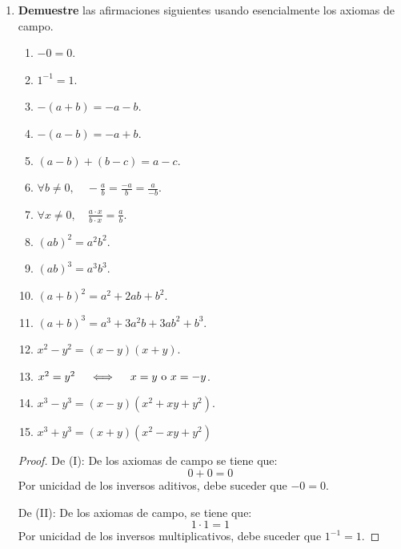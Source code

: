 \documentclass[12pt]{article}
\begin{document}
\begin{enumerate}
    \item \textbf{Demuestre} las afirmaciones siguientes usando esencialmente los axiomas de campo.
    \begin{multicols}{2}
        \begin{enumerate}
            \item $-0=0$.
            \item $1^{-1}=1$.
            \item $-\left(a+b\right)=-a-b$.
            \item $-\left(a-b\right)=-a+b$.
            \item $\left(a-b\right)+\left(b-c\right)=a-c$.
            \item $\forall b\neq 0, \quad -\frac{a}{b}=\frac{-a}{b}=\frac{a}{-b}$.
            \item $\forall x\neq 0, \quad \frac{a\cdot x}{b \cdot x}=\frac{a}{b}$.
            \item $\left(ab\right)^2=a^2b^2$.
            \item $\left(ab\right)^3=a^3b^3$.
            \item $\left(a+b\right)^2=a^2+2ab+b^2$.
            \item $\left(a+b\right)^3=a^3+3a^2b+3ab^2+b^3$.
            \item $x^2-y^2=\left(x-y\right)\left(x+y\right)$.
            \item $x^2=y^2\quad \iff \quad x=y \textup{ o } x=-y$.
            \item $x^3-y^3 = \left(x-y\right)\left(x^2+xy+y^2\right)$.
            \item $x^3+y^3 = \left(x+y\right)\left(x^2-xy+y^2\right)$
        \end{enumerate}
    \end{multicols}
    \begin{proof}
        De (I): De los axiomas de campo se tiene que:
        \begin{equation*}
            0+0=0
        \end{equation*}
        Por unicidad de los inversos aditivos, debe suceder que $-0=0$.
        
        De (II): De los axiomas de campo, se tiene que:
        \begin{equation*}
            1\cdot1=1
        \end{equation*}
        Por unicidad de los inversos multiplicativos, debe suceder que $1^{-1}=1$.
        

\end{proof}
\end{enumerate}
\end{document}
